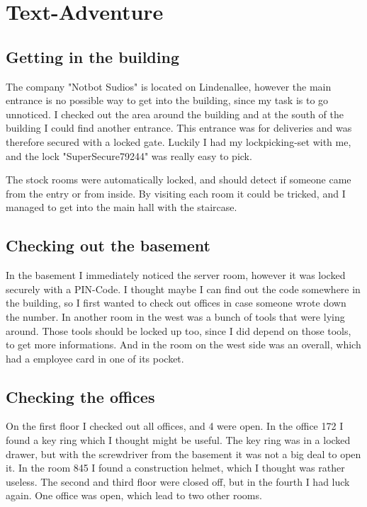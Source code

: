 \section{Text-Adventure}

\subsection{Getting in the building}
The company "Notbot Sudios" is located on Lindenallee, however the main entrance is no possible way to get into the building, since my task is to go unnoticed. I checked out the area around the building and at the south of the building I could find another entrance. This entrance was for deliveries and was therefore secured with a locked gate. Luckily I had my lockpicking-set with me, and the lock "SuperSecure79244" was really easy to pick.

The stock rooms were automatically locked, and should detect if someone came from the entry or from inside. By visiting each room it could be tricked, and I managed to get into the main hall with the staircase.

\subsection{Checking out the basement}
In the basement I immediately noticed the server room, however it was locked securely with a PIN-Code. I thought maybe I can find out the code somewhere in the building, so I first wanted to check out offices in case someone wrote down the number. In another room in the west was a bunch of tools that were lying around. Those tools should be locked up too, since I did depend on those tools, to get more informations. And in the room on the west side was an overall, which had a employee card in one of its pocket.

\subsection{Checking the offices}
On the first floor I checked out all offices, and 4 were open. In the office 172 I found a key ring which I thought might be useful. The key ring was in a locked drawer, but with the screwdriver from the basement it was not a big deal to open it. In the room 845 I found a construction helmet, which I thought was rather useless. The second and third floor were closed off, but in the fourth I had luck again. One office was open, which lead to two other rooms. \\

